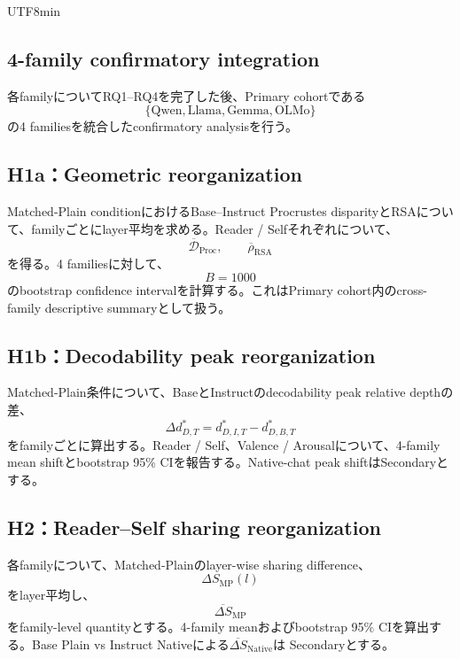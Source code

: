 \documentclass{article} %
\begin{document}
\begin{CJK*}{UTF8}{min}

\subsection{4-family confirmatory integration}
\label{app:v2-confirmatory}

各familyについてRQ1--RQ4を完了した後、Primary cohortである
\[
\{
\text{Qwen},
\text{Llama},
\text{Gemma},
\text{OLMo}
\}
\]
の4 familiesを統合したconfirmatory analysisを行う。


\subsection{H1a：Geometric reorganization}

Matched-Plain conditionにおけるBase--Instruct Procrustes disparityとRSAについて、familyごとにlayer平均を求める。Reader / Selfそれぞれについて、
\[
\overline{\mathcal{D}}_{\mathrm{Proc}},
\qquad
\overline{\rho}_{\mathrm{RSA}}
\]
を得る。4 familiesに対して、
\[
B=1000
\]
のbootstrap confidence intervalを計算する。これはPrimary cohort内のcross-family descriptive summaryとして扱う。


\subsection{H1b：Decodability peak reorganization}

Matched-Plain条件について、BaseとInstructのdecodability peak relative depthの差、
\[
\Delta d_{D,T}^{*}
=
d_{D,I,T}^{*}
-
d_{D,B,T}^{*}
\]
をfamilyごとに算出する。Reader / Self、Valence / Arousalについて、4-family mean shiftとbootstrap 95\% CIを報告する。Native-chat peak shiftはSecondaryとする。


\subsection{H2：Reader--Self sharing reorganization}

各familyについて、Matched-Plainのlayer-wise sharing difference、
\[
\Delta S_{\mathrm{MP}}(l)
\]
をlayer平均し、
\[
\overline{\Delta S}_{\mathrm{MP}}
\]
をfamily-level quantityとする。4-family meanおよびbootstrap 95\% CIを算出する。Base Plain vs Instruct Nativeによる\(\overline{\Delta S}_{\mathrm{Native}}\)は
Secondaryとする。



\end{CJK*}
\end{document}
